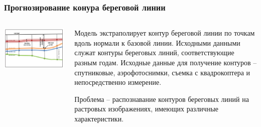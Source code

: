 \documentclass[10pt]{beamer}
\begin{document}
\begin{frame}[fragile]
\begin{columns}
\begin{column}{0.5\linewidth}
    \end{column}
  \end{columns}
\end{frame}

\begin{frame}[fragile]
  \frametitle{Прогнозирование конура береговой линии}
  \begin{columns}
    \begin{column}{0.6\linewidth}
      \includegraphics[width=\linewidth]{dsas-model.png}
    \end{column}
    \begin{column}{0.4\linewidth}
      Модель экстраполирует контур береговой линии по точкам вдоль нормали к базовой линии.  Исходными данными служат контуры береговых линий, соответствующие разным годам.  Исходные данные для получение контуров -- спутниковые, аэрофотоснимки, съемка с квадрокоптера и непосредственно измерение.

      Проблема -- распознавание контуров береговых линий на растровых изображениях, имеющих различные характеристики.
    \end{column}
  \end{columns}
\end{frame}
\end{document}
